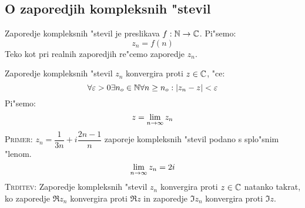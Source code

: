 \subsection{O zaporedjih kompleksnih "stevil}
 Zaporedje kompleksnih "stevil je preslikava $f: \mathbb{N} \to \mathbb{C}$. Pi"semo:
\begin{equation*}
z_n = f(n)
\end{equation*}
Teko kot pri realnih zaporedjih re"cemo zaporedje $z_n$.

 Zaporedje kompleksnih "stevil $z_n$ konvergira proti $z \in \mathbb{C}$, "ce:
\begin{equation*}
\forall \varepsilon > 0 \exists n_o \in \mathbb{N} \forall n \geq n_o: |z_n - z| < \varepsilon
\end{equation*}
Pi"semo:
\begin{equation*}
z = \lim_{n \rightarrow \infty} z_n
\end{equation*}
\textsc{Primer:} $z_n = \dfrac{1}{3n} + i\dfrac{2n-1}{n}$ zaporeje kompleksnih "stevil podano s splo"snim "lenom.
\begin{equation*}
\lim_{n \rightarrow \infty} z_n = 2i
\end{equation*}
\textsc{Trditev:} Zaporedje kompleksnih "stevil $z_n$ konvergira proti $z \in \mathbb{C}$ natanko takrat, ko zaporedje $\Re z_n$ konvergira proti $\Re z$ in zaporedje $\Im z_n$ konvergira proti $\Im z$.

